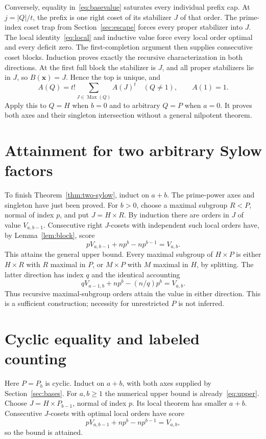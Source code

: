 \documentclass[11pt,letterpaper]{article}
\theoremstyle{definition}\newtheorem{definition}{Definition}
\newcommand{\Max}{\operatorname{Max}}
\begin{document}
Conversely, equality in~\eqref{eq:basevalue} saturates every individual prefix cap. At $j=|Q|/t$, the prefix is one right coset of its stabilizer $J$ of that order. The prime-index coset trap from Section~\ref{sec:escape} forces every proper stabilizer into $J$. The local identity~\eqref{eq:local} and inductive value force every local order optimal and every deficit zero. The first-completion argument then supplies consecutive coset blocks. Induction proves exactly the recursive characterization in both directions. At the first full block the stabilizer is $J$, and all proper stabilizers lie in $J$, so $B(\mathbf{x})=J$. Hence the top is unique, and
\[
A(Q)=t!\sum_{J\in\Max(Q)}A(J)^t\quad(Q\ne1),\qquad A(1)=1.
\]
Apply this to $Q=H$ when $b=0$ and to arbitrary $Q=P$ when $a=0$. It proves both axes and their singleton intersection without a general nilpotent theorem.

\section{Attainment for two arbitrary Sylow factors}\label{sec:attainment}
To finish Theorem~\ref{thm:two-sylow}, induct on $a+b$. The prime-power axes and singleton have just been proved. For $b>0$, choose a maximal subgroup $R<P$, normal of index $p$, and put $J=H\times R$. By induction there are orders in $J$ of value $V_{a,b-1}$. Consecutive right $J$-cosets with independent such local orders have, by Lemma~\ref{lem:block}, score
\[
pV_{a,b-1}+np^b-np^{b-1}=V_{a,b}.
\]
This attains the general upper bound. Every maximal subgroup of $H\times P$ is either $H\times R$ with $R$ maximal in $P$, or $M\times P$ with $M$ maximal in $H$, by splitting. The latter direction has index $q$ and the identical accounting
\[
qV_{a-1,b}+np^b-(n/q)p^b=V_{a,b}.
\]
Thus recursive maximal-subgroup orders attain the value in either direction. This is a sufficient construction; necessity for unrestricted $P$ is not inferred.

\section{Cyclic equality and labeled counting}\label{sec:equality}
Here $P=P_b$ is cyclic. Induct on $a+b$, with both axes supplied by Section~\ref{sec:bases}. For $a,b\ge1$ the numerical upper bound is already~\eqref{eq:upper}. Choose $J=H\times P_{b-1}$, normal of index $p$. Its local theorem has smaller $a+b$. Consecutive $J$-cosets with optimal local orders have score
\begin{equation}
pV_{a,b-1}+np^b-np^{b-1}=V_{a,b},\label{eq:attain}
\end{equation}
so the bound is attained.
\end{document}
